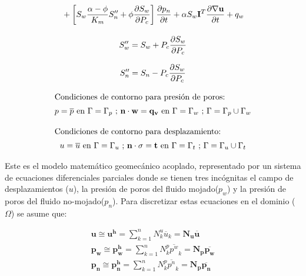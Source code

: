 \begin{ceqn}
\begin{subequations}
\begin{gather}
\begin{multlined}
+ \left[S_w \frac{\alpha - \phi}{K_m}S''_n + \phi\frac{\partial S_w}{\partial P_c}\right]\frac{\partial p_n}{\partial t} +\alpha S_w\mathbf{I}^T\frac{\partial \nabla \mathbf{u}}{\partial t} + q_w\end{multlined} \label{eq:equ358h}\\[10pt]
S''_w = S_w + P_c\frac{\partial S_w}{\partial P_c}  \label{eq:equ358i}\\[8pt]
S''_n = S_n - P_c\frac{\partial S_w}{\partial P_c}  \label{eq:equ358j}\\[8pt]
\shortintertext{Condiciones de contorno para presión de poros:} 	
p = \overline{p} \text{  en  } \Gamma = \Gamma_p \text{ ;  } \mathbf{n}\cdot\mathbf{w}=\mathbf{q_v} \text{  en  } \Gamma = \Gamma_w \text{ ; } \Gamma = \Gamma_p \cup \Gamma_w \label{eq:equ358k}\\[8pt]
\shortintertext{Condiciones de contorno para desplazamiento:} 	
u = \overline{u} \text{  en  } \Gamma = \Gamma_u \text{ ;  } \mathbf{n}\cdot\mathbf{\sigma}=\mathbf{t} \text{  en  } \Gamma = \Gamma_t \text{ ; } \Gamma = \Gamma_u \cup \Gamma_t \label{eq:equ358l}
\end{gather}  
\end{subequations} 
\end{ceqn}

Este es el modelo matemático geomecánico acoplado, representado por un sistema de ecuaciones diferenciales parciales donde se tienen tres incógnitas el campo de desplazamientos ($u$), la presión de poros del fluido mojado($p_w$) y la presión de poros del fluido no-mojado($p_n$). Para discretizar estas ecuaciones en el dominio ($\Omega$) se asume que:

\begin{ceqn} 
\begin{subequations} \label{eq:equ359} 
\begin{gather}
\mathbf{u} \cong \mathbf{u^h} = \displaystyle\sum_{k=1}^{n} N_{k}^{u} \overline{u}_k = \mathbf{N_u}\mathbf{\overline{u}}  \label{eq:equ359a}\\[12pt]
\mathbf{p_w} \cong \mathbf{p_{w}^h} = \displaystyle\sum_{k=1}^{n} N_{k}^{p} \overline{p^w}_k = \mathbf{N_p}\mathbf{\overline{p_w}}  \label{eq:equ359b}\\[12pt]
\mathbf{p_n} \cong \mathbf{p_{n}^h} = \displaystyle\sum_{k=1}^{n} N_{k}^{p} \overline{p^n}_k = \mathbf{N_p}\mathbf{\overline{p_n}}  \label{eq:equ359c}
\end{gather}  
\end{subequations} 
\end{ceqn}

